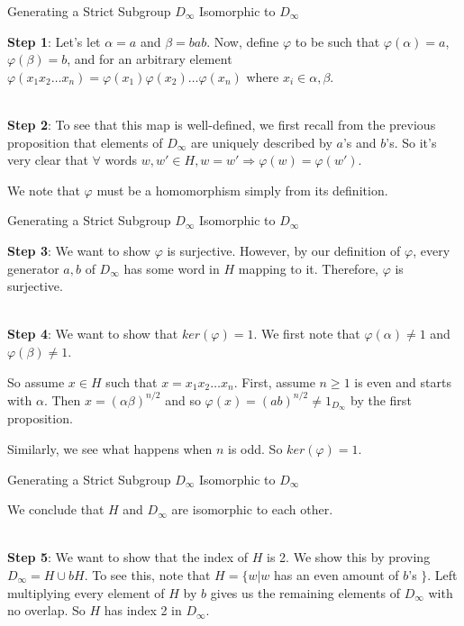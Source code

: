 \documentclass[usenames,dvipsnames]{beamer}
\begin{document}
\begin{frame}{Generating a Strict Subgroup $D_\infty$ Isomorphic to $D_\infty$}

\textbf{Step 1}: Let's let $\alpha=a$ and $\beta=bab$. Now, define $\varphi$ to be such that
$\varphi(\alpha)=a$, $\varphi(\beta)=b$, and for an arbitrary element $\varphi(x_{1}x_{2}\ldots
x_{n})=\varphi(x_{1})\varphi(x_{2})\ldots \varphi(x_{n})$ where $x_{i}\in {\alpha, \beta}$. \\~\\

\pause{}

\textbf{Step 2}: To see that this map is well-defined, we first recall from the previous proposition that
elements of $D_\infty$ are uniquely described by $a$'s and $b$'s. So it's very clear that $\forall$ words
$w,w'\in H, w=w' \Rightarrow \varphi(w)=\varphi(w')$. 

\pause{}

We note that $\varphi$ must be a homomorphism simply from its definition.

\end{frame}

\begin{frame}{Generating a Strict Subgroup $D_\infty$ Isomorphic to $D_\infty$}

\textbf{Step 3}: We want to show $\varphi$ is surjective. However, by our definition of $\varphi$, every
generator ${a,b}$ of $D_\infty$ has some word in $H$ mapping to it. Therefore, $\varphi$ is surjective.
\\~\\

\pause{}

\textbf{Step 4}: We want to show that $ker(\varphi)={1}$. We first note that $\varphi(\alpha)\neq 1$ and
$\varphi(\beta)\neq 1$.  

\pause{}

So assume $x\in H$ such that $x=x_{1}x_{2}\ldots x_{n}$. First, assume $n\geq 1$ is even and starts with
$\alpha$. Then $x=(\alpha\beta)^{n/2}$ and so $\varphi(x)=(ab)^{n/2}\neq 1_{D_\infty}$ by the first
proposition. 

\pause{}

Similarly, we see what happens when $n$ is odd. So $ker(\varphi)={1}$.

\end{frame}

\begin{frame}{Generating a Strict Subgroup $D_\infty$ Isomorphic to $D_\infty$}

We conclude that $H$ and $D_\infty$ are isomorphic to each other. \\~\\

\pause{}

\textbf{Step 5}: We want to show that the index of $H$ is 2. We show this by proving $D_\infty=H\cup bH$.
\pause{} To see this, note that $H=\{ w | w $ has an even amount of $b$'s $\}$. Left multiplying every
element of $H$ by $b$ gives us the remaining elements of $D_\infty$ with no overlap. So $H$ has index 2 in
$D_\infty$.

\end{frame}
\end{document}
